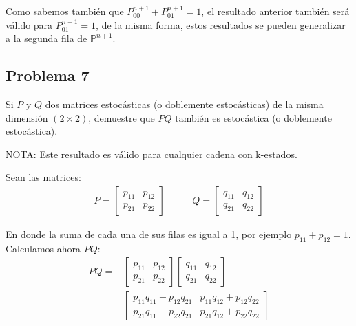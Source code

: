 \documentclass{article}
\begin{document}
            Como sabemos también que $P_{00}^{n+1} + P_{01}^{n+1} = 1$, el resultado anterior también será válido para $P_{01}^{n+1} = 1$, de la misma forma, estos resultados se pueden generalizar a la segunda fila de $\mathbb{P}^{n+1}$.

        \subsection*{Problema 7}

            Si $P$ y $Q$ dos matrices estocásticas (o doblemente estocásticas) de la misma dimensión $(2 \times 2)$, demuestre que $PQ$ también es estocástica (o doblemente estocástica).

            NOTA: Este resultado es válido para cualquier cadena con k-estados.

            Sean las matrices:
            \begin{equation}
                \begin{split}
                    P = \begin{bmatrix}
                        p_{11} & p_{12} \\
                        p_{21} & p_{22}
                    \end{bmatrix} & \qquad Q = \begin{bmatrix}
                        q_{11} & q_{12} \\
                        q_{21} & q_{22}
                    \end{bmatrix}
                \end{split}
            \end{equation}

            En donde la suma de cada una de sus filas es igual a 1, por ejemplo $p_{11} + p_{12} = 1$. Calculamos ahora $PQ$:
            \begin{equation}
                \begin{split}
                    PQ =& \begin{bmatrix}
                        p_{11} & p_{12} \\
                        p_{21} & p_{22}
                    \end{bmatrix} \begin{bmatrix}
                        q_{11} & q_{12} \\
                        q_{21} & q_{22}
                    \end{bmatrix} \\
                    & \begin{bmatrix}
                        p_{11} q_{11} + p_{12} q_{21} & p_{11} q_{12} + p_{12} q_{22} \\
                        p_{21} q_{11} + p_{22} q_{21} & p_{21} q_{12} + p_{22} q_{22}
                    \end{bmatrix}
                \end{split}
            \end{equation}
\end{document}
